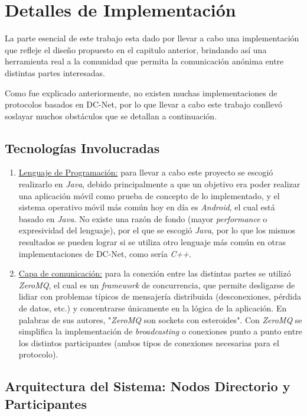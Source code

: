 \chapter{Detalles de Implementación}

La parte esencial de este trabajo esta dado por llevar a cabo una implementación que refleje el diseño propuesto en el capitulo anterior, brindando así una herramienta real a la comunidad que permita la comunicación anónima entre distintas partes interesadas.

Como fue explicado anteriormente, no existen muchas implementaciones de protocolos basados en DC-Net, por lo que llevar a cabo este trabajo conllevó soslayar muchos obstáculos que se detallan a continuación.

\section{Tecnologías Involucradas}

\begin{enumerate}
    \item \underline{Lenguaje de Programación:} para llevar a cabo este proyecto se escogió realizarlo en \emph{Java}, debido principalmente a que un objetivo era poder realizar una aplicación móvil como prueba de concepto de lo implementado, y el sistema operativo móvil más común hoy en día es \emph{Android}, el cual está basado en \emph{Java}. No existe una razón de fondo (mayor \emph{performance} o expresividad del lenguaje), por el que se escogió \emph{Java}, por lo que los mismos resultados se pueden lograr si se utiliza otro lenguaje más común en otras implementaciones de DC-Net, como sería \emph{C++}.
    \item \underline{Capa de comunicación:} para la conexión entre las distintas partes se utilizó \emph{ZeroMQ}, el cual es un \emph{framework} de concurrencia, que permite desligarse de lidiar con problemas típicos de mensajería distribuida (desconexiones, pérdida de datos, etc.) y concentrarse únicamente en la lógica de la aplicación. En palabras de sus autores, "\emph{ZeroMQ} son sockets con esteroides". Con \emph{ZeroMQ} se simplifica la implementación de \emph{broadcasting} o conexiones punto a punto entre los distintos participantes (ambos tipos de conexiones necesarias para el protocolo).
\end{enumerate}

\section{Arquitectura del Sistema: Nodos Directorio y Participantes}

